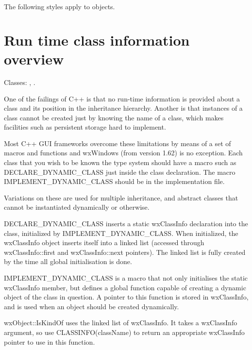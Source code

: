 The following styles apply to  objects.

\begin{twocollist}\itemsep=0pt
\end{twocollist}

\section{Run time class information overview}\label{runtimeclassoverview}

Classes: , .

One of the failings of C++ is that no run-time information is provided
about a class and its position in the inheritance hierarchy.
Another is that instances of a class cannot be created just by knowing the name of a class,
which makes facilities such as persistent storage hard to implement.

Most C++ GUI frameworks overcome these limitations by means of a set of
macros and functions and wxWindows (from version 1.62) is no exception.
Each class that you wish to be known the type system should have
a macro such as DECLARE\_DYNAMIC\_CLASS just inside the class declaration.
The macro IMPLEMENT\_DYNAMIC\_CLASS should be in the implementation file.

Variations on these  are used for multiple inheritance, and abstract
classes that cannot be instantiated dynamically or otherwise.

DECLARE\_DYNAMIC\_CLASS inserts a static wxClassInfo declaration into the
class, initialized by IMPLEMENT\_DYNAMIC\_CLASS. When initialized, the
wxClassInfo object inserts itself into a linked list (accessed through
wxClassInfo::first and wxClassInfo::next pointers). The linked list
is fully created by the time all global initialisation is done.

IMPLEMENT\_DYNAMIC\_CLASS is a macro that not only initialises the static
wxClassInfo member, but defines a global function capable of creating a
dynamic object of the class in question. A pointer to this function is
stored in wxClassInfo, and is used when an object should be created
dynamically.

wxObject::IsKindOf uses the linked list of wxClassInfo. It takes
a wxClassInfo argument, so use CLASSINFO(className) to return an
appropriate wxClassInfo pointer to use in this function.


